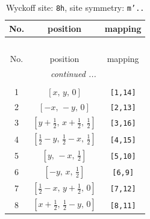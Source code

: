 \documentclass[fleqn,8pt]{jsarticle}
\begin{document}
\begin{longtable}{ccc}
\caption{Wyckoff site: {\tt 8h}, site symmetry: {\tt m'..}}
 \\
 \hline \hline
No. & position & mapping \\ \hline \endfirsthead

\multicolumn{2}{l}{\tablename\ \thetable{}} \\
 \hline \hline
No. & position & mapping \\ \hline \endhead

 \hline \hline
\multicolumn{2}{r}{\footnotesize\it continued ...} \\ \endfoot

 \hline \hline
\multicolumn{2}{r}{} \\ \endlastfoot

1 & $\left[ x,\, y,\, 0 \right]$ & {\tt [1,14]} \\ \hline
2 & $\left[ - x,\, - y,\, 0 \right]$ & {\tt [2,13]} \\ \hline
3 & $\left[ y + \frac{1}{2},\, x + \frac{1}{2},\, \frac{1}{2} \right]$ & {\tt [3,16]} \\ \hline
4 & $\left[ \frac{1}{2} - y,\, \frac{1}{2} - x,\, \frac{1}{2} \right]$ & {\tt [4,15]} \\ \hline
5 & $\left[ y,\, - x,\, \frac{1}{2} \right]$ & {\tt [5,10]} \\ \hline
6 & $\left[ - y,\, x,\, \frac{1}{2} \right]$ & {\tt [6,9]} \\ \hline
7 & $\left[ \frac{1}{2} - x,\, y + \frac{1}{2},\, 0 \right]$ & {\tt [7,12]} \\ \hline
8 & $\left[ x + \frac{1}{2},\, \frac{1}{2} - y,\, 0 \right]$ & {\tt [8,11]} \\
\end{longtable}
\renewcommand{\arraystretch}{1.2}
\end{document}
